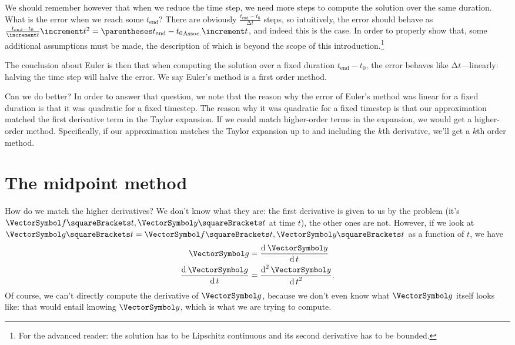 \documentclass[10pt, a4paper, twoside]{basestyle}
\begin{document}
We should remember however that when we reduce the time step, we need more steps to compute the solution over the same duration. What is the error when we reach some $t_{\text{end}}$? There are obviously $\frac{t_{\text{end}} - t_0}{\increment t}$ steps, so intuitively, the error should behave as $\frac{t_{\text{end}} - t_0}{\increment t} \increment t^2 = \pa{t_{\text{end}} - t_0} \increment t$, and indeed this is the case. In order to properly show that, some additional assumptions must be made, the description of which is beyond the scope of this introduction.\footnote{For the advanced reader: the solution has to be Lipschitz continuous and its second derivative has to be bounded.}

The conclusion about Euler is then that when computing the solution over a fixed duration $t_{\text{end}} - t_0$, the error behaves like $\increment t$---linearly: halving the time step will halve the error. We say Euler's method is a first order method.

Can we do better? In order to answer that question, we note that the reason why the error of Euler's method was linear for a fixed duration is that it was quadratic for a fixed timestep. The reason why it was quadratic for a fixed timestep is that our approximation matched the first derivative term in the Taylor expansion. If we could match higher-order terms in the expansion, we would get a higher-order method. Specifically, if our approximation matches the Taylor expansion up to and including the $k$th derivative, we'll get a $k$th order method.

\section{The midpoint method}
How do we match the higher derivatives? We don't know what they are: the first derivative is given to us by the problem (it's $\vf\of{t, \vy\of t}$ at time $t$), the other ones are not. 
However, if we look at $\vg\of t = \vf\of{t, \vy\of t}$ as a function of $t$,
we have 
\begin{align*}
\vg &= \deriv t \vy \\
\deriv t \vg &= \deriv[2] t \vy\text.
\end{align*}
Of course, we can't directly compute the derivative of $\vg$, because we don't even know what $\vg$ itself looks like: that would entail knowing $\vy$, which is what we are trying to compute.
\end{document}
